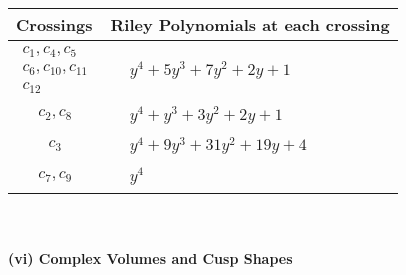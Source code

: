 \documentclass[1p]{elsarticle_modified}
\theoremstyle{definition}
\begin{document}
\begin{tabular}{m{50pt}|m{274pt}}
Crossings & \hspace{64pt}Riley Polynomials at each crossing \\
\hline $$\begin{aligned}c_{1},c_{4},c_{5}\\c_{6},c_{10},c_{11}\\c_{12}\end{aligned}$$&$\begin{aligned}
&y^4+5 y^3+7 y^2+2 y+1
\end{aligned}$\\
\hline $$\begin{aligned}c_{2},c_{8}\end{aligned}$$&$\begin{aligned}
&y^4+y^3+3 y^2+2 y+1
\end{aligned}$\\
\hline $$\begin{aligned}c_{3}\end{aligned}$$&$\begin{aligned}
&y^4+9 y^3+31 y^2+19 y+4
\end{aligned}$\\
\hline $$\begin{aligned}c_{7},c_{9}\end{aligned}$$&$\begin{aligned}
&y^4
\end{aligned}$\\
\hline
\end{tabular}\\~\\
\newpage\flushleft \textbf{(vi) Complex Volumes and Cusp Shapes}
\end{document}
